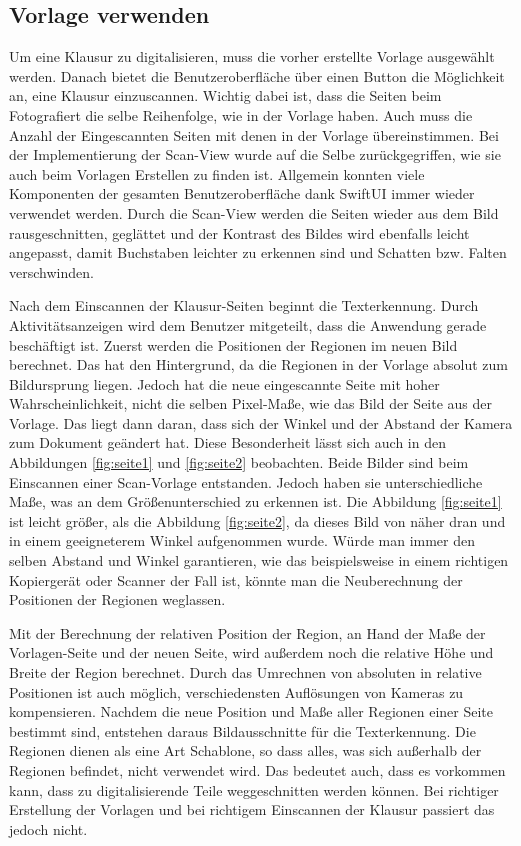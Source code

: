 \documentclass[nomenclature, oneside, 150]{HSMW-Thesis}
\begin{document}
		\subsection{Vorlage verwenden}
			Um eine Klausur zu digitalisieren, muss die vorher erstellte Vorlage ausgewählt werden. Danach bietet die Benutzeroberfläche über einen Button die Möglichkeit an, eine Klausur einzuscannen. Wichtig dabei ist, dass die Seiten beim Fotografiert die selbe Reihenfolge, wie in der Vorlage haben. Auch muss die Anzahl der Eingescannten Seiten mit denen in der Vorlage übereinstimmen. Bei der Implementierung der Scan-View wurde auf die Selbe zurückgegriffen, wie sie auch beim Vorlagen Erstellen zu finden ist. Allgemein konnten viele Komponenten der gesamten Benutzeroberfläche dank SwiftUI immer wieder verwendet werden. Durch die Scan-View werden die Seiten wieder aus dem Bild rausgeschnitten, geglättet und der Kontrast des Bildes wird ebenfalls leicht angepasst, damit Buchstaben leichter zu erkennen sind und Schatten bzw. Falten verschwinden.
			
			Nach dem Einscannen der Klausur-Seiten beginnt die Texterkennung. Durch Aktivitätsanzeigen wird dem Benutzer mitgeteilt, dass die Anwendung gerade beschäftigt ist. Zuerst werden die Positionen der Regionen im neuen Bild berechnet. Das hat den Hintergrund, da die Regionen in der Vorlage absolut zum Bildursprung liegen. Jedoch hat die neue eingescannte Seite mit hoher Wahrscheinlichkeit, nicht die selben Pixel-Maße, wie das Bild der Seite aus der Vorlage. Das liegt dann daran, dass sich der Winkel und der Abstand der Kamera zum Dokument geändert hat. Diese Besonderheit lässt sich auch in den Abbildungen \ref{fig:seite1} und \ref{fig:seite2} beobachten. Beide Bilder sind beim Einscannen einer Scan-Vorlage entstanden. Jedoch haben sie unterschiedliche Maße, was an dem Größenunterschied zu erkennen ist. Die Abbildung \ref{fig:seite1} ist leicht größer, als die Abbildung \ref{fig:seite2}, da dieses Bild von näher dran und in einem geeigneterem Winkel aufgenommen wurde. Würde man immer den selben Abstand und Winkel garantieren, wie das beispielsweise in einem richtigen Kopiergerät oder Scanner der Fall ist, könnte man die Neuberechnung der Positionen der Regionen weglassen. 
			
			Mit der Berechnung der relativen Position der Region, an Hand der Maße der Vorlagen-Seite und der neuen Seite, wird außerdem noch die relative Höhe und Breite der Region berechnet. Durch das Umrechnen von absoluten in relative Positionen ist auch möglich, verschiedensten Auflösungen von Kameras zu kompensieren. Nachdem die neue Position und Maße aller Regionen einer Seite bestimmt sind, entstehen daraus Bildausschnitte für die Texterkennung. Die Regionen dienen als eine Art Schablone, so dass alles, was sich außerhalb der Regionen befindet, nicht verwendet wird. Das bedeutet auch, dass es vorkommen kann, dass zu digitalisierende Teile weggeschnitten werden können. Bei richtiger Erstellung der Vorlagen und bei richtigem Einscannen der Klausur passiert das jedoch nicht. 
\end{document}
